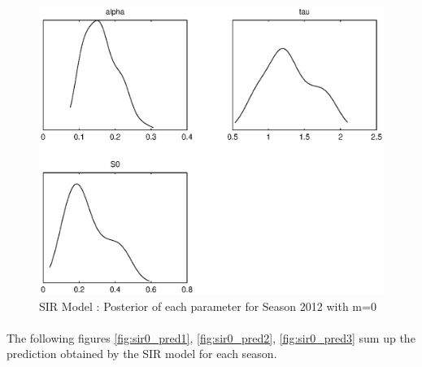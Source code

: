 \documentclass[11pt, a4paper]{article}
\begin{document}
\begin{figure}[H!]
    \includegraphics[height = 0.25\textheight]{figures/SIR_posterior_season3_m=0.eps}
    \caption{SIR Model : Posterior of each parameter for Season 2012 with m=0}
    \label{fig:sir0_post3}
\end{figure}


\paragraph{}
The following figures \ref{fig:sir0_pred1}, \ref{fig:sir0_pred2}, \ref{fig:sir0_pred3} sum up the prediction obtained by the SIR model for each season.
\end{document}
